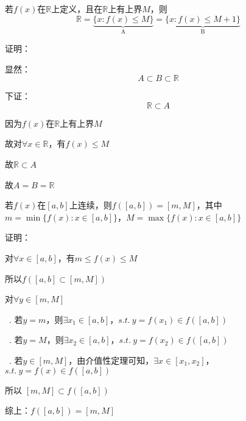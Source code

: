 \begin{eg}
若$f(x)$在$\mathbb{R}$上定义，且在$\mathbb{R}$上有上界$M$，则\[\mathbb{R} = \underbrace{\{x : f(x) \leqslant M\}}_\text{A} = \underbrace{\{x : f(x) \leqslant M + 1\}}_\text{B}\]
\end{eg}
\noindent 证明：
\par
显然：
\[A\subset B\subset \mathbb{R}\]
\par
下证：
\[\mathbb{R}\subset A\]
\par
因为$f(x)$在$\mathbb{R}$上有上界$M$
\par
故对$\forall x \in \mathbb{R}$，有$f(x) \leqslant M$
\par
故$\mathbb{R} \subset A$
\par
故$A = B = \mathbb{R}$
\begin{eg} 
若$f(x)$在$\left[a,b\right]$上连续，则$f(\left[a,b\right]) = \left[m,M\right]$，其中$m = \min \{f(x) : x \in \left[a,b\right]\}$，$M = \max \{f(x) : x \in \left[a,b\right]\}$
\end{eg}
\noindent 证明：
\par {} 对$\forall x \in \left[a,b\right]$，有$m \leqslant f(x) \leqslant M$
\par \quad 所以$f(\left[a,b\right] \subset \left[m,M\right])$
\par {} 对$\forall y \in \left[m,M\right]$
\par \quad \ . 若$y = m$，则$\exists x_{1} \in \left[a,b\right]$，$s.t. \ y = f(x_{1}) \in f(\left[a,b\right])$
\par \quad \ . 若$y = M$，则$\exists x_{2} \in \left[a,b\right]$，$s.t. \ y = f(x_{2}) \in f(\left[a,b\right])$
\par \quad \ . 若$y \in \left[m,M\right]$，由介值性定理可知，$\exists x \in [x_{1},x_{2}]$，$s.t. \ y = f(x) \in f(\left[a,b\right])$
\par \quad 所以 $\left[m,M\right] \subset f(\left[a,b\right])$
\par 综上：$f(\left[a,b\right]) = \left[m,M\right]$
